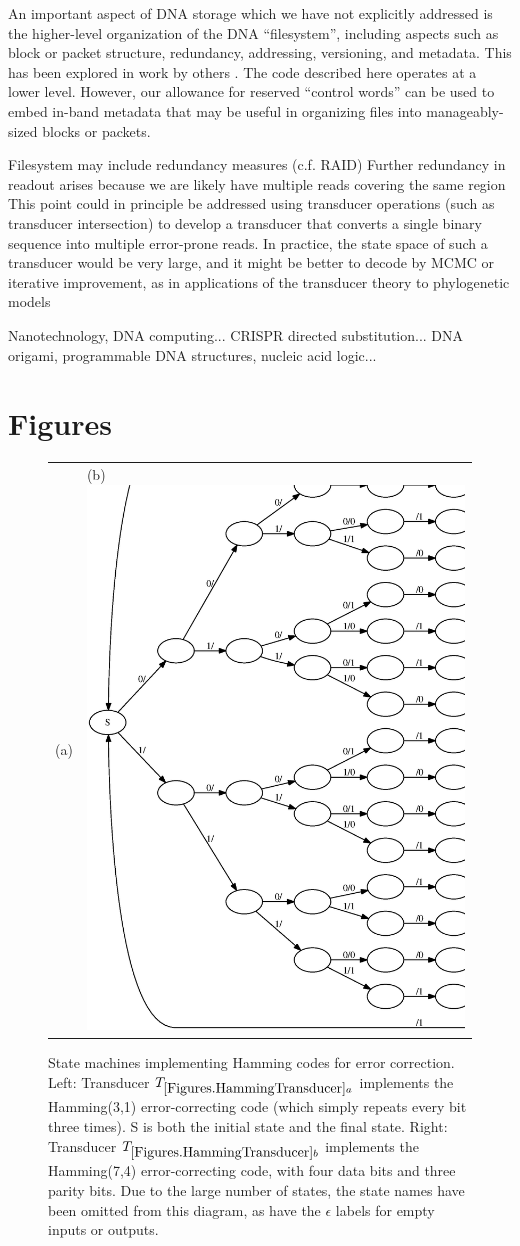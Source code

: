 \documentclass[english]{article}
\begin{document}
An important aspect of DNA storage which we have not explicitly addressed
is the higher-level organization of the DNA ``filesystem'',
including aspects such as block or packet structure, redundancy, addressing,
versioning, and metadata.
This has been explored in work by others \cite{YazdiEtAl2015,BornholtEtAl2016}.
The code described here operates at a lower level.
However, our allowance for reserved ``control words''
can be used to embed in-band metadata that may be useful in organizing files into manageably-sized blocks or packets.


Filesystem may include redundancy measures (c.f. RAID)
Further redundancy in readout arises because we are likely have multiple reads covering the same region
This point could in principle be addressed using transducer operations
(such as transducer intersection) to develop a transducer that converts a single binary sequence
into multiple error-prone reads.
In practice, the state space of such a transducer would be very large, and it might be better
to decode by MCMC or iterative improvement, as in applications of the transducer theory
to phylogenetic models \cite{Holmes2003}

Nanotechnology, DNA computing...
CRISPR directed substitution...
DNA origami, programmable DNA structures, nucleic acid logic...


\newpage
\section{Figures}

\newpage
\begin{figure}
\begin{tabular}{ll}
(a) {hamming31}{width=.45\textwidth}
&
(b) \includegraphics[width=.45\textwidth]{hamming74.ps}
\end{tabular}
\caption{ 
State machines implementing Hamming codes for error correction.
Left:
Transducer $\hammingthreeone$ implements the Hamming(3,1) error-correcting code
(which simply repeats every bit three times).
S is both the initial state and the final state.
Right:
Transducer $\hammingsevenfour$ implements the Hamming(7,4) error-correcting code,
with four data bits and three parity bits.
Due to the large number of states, the state names have been omitted from this diagram,
as have the $\epsilon$ labels for empty inputs or outputs.
}
\end{figure}
\end{document}
